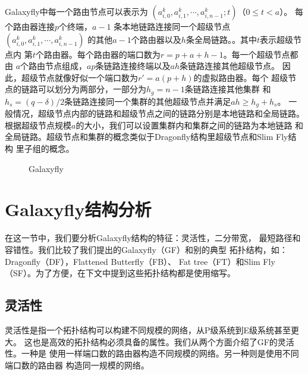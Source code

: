 Galaxyfly中每一个路由节点可以表示为
$(a_{i,0}^{k},  a_{i,1}^{k},  \cdots,  a_{i,n-1}^{k};t)$（$0\leq t < a$）。
每个路由器连接$p$个终端，$a-1$ 条本地链路连接同一个超级节点
$(a_{i,0}^{k},  a_{i,1}^{k},  \cdots,  a_{i,n-1}^{k})$
的其他$a-1$个路由器以及$h$条全局链路。。其中$t$表示超级节点内
第$t$个路由器。每个路由器的端口数为$r=p+a+h-1$。每一个超级节点都由
$a$个路由节点组成，$ap$条链路连接终端以及$ah$条链路连接其他超级节点。
因此，超级节点就像好似一个端口数为$r'=a(p+h)$的虚拟路由器。每个
超级节点的链路可以划分为两部分，一部分为$h_g=n-1$条链路连接其他集群
和$h_{s}=(q-\delta)/2$条链路连接同一个集群的其他超级节点并满足$ah\geq h_{g}+h_{s}$。
一般情况，超级节点内部的链路和超级节点之间的链路分别是本地链路和全局链路。
根据超级节点规模$a$的大小，我们可以设置集群内和集群之间的链路为本地链路
和全局链路。超级节点和集群的概念类似于Dragonfly结构里超级节点和Slim Fly结构
里子组的概念。



\begin{figure}[t]
  \centering
    \begin{minipage}[t]{\textwidth}
   \centering

  \caption{Galaxyfly}
  \label{gfgraph}
    \end{minipage}
\end{figure}

\section{Galaxyfly结构分析}

在这一节中，我们要分析Galaxyfly结构的特征：灵活性，二分带宽，
最短路径和容错性。我们比较了我们提出的Galaxyfly（GF）和别的典型
拓扑结构，如：Dragonfly（DF），Flattened Butterfly（FB）、
Fat tree（FT）和Slim Fly（SF）。为了方便，在下文中提到这些拓扑结构都是使用缩写。

\subsection{灵活性}

灵活性是指一个拓扑结构可以构建不同规模的网络，从P级系统到E级系统甚至更大。
这也是高效的拓扑结构必须具备的属性。我们从两个方面介绍了GF的灵活性。一种是
使用一样端口数的路由器构造不同规模的网络。另一种则是使用不同端口数的路由器
构造同一规模的网络。

